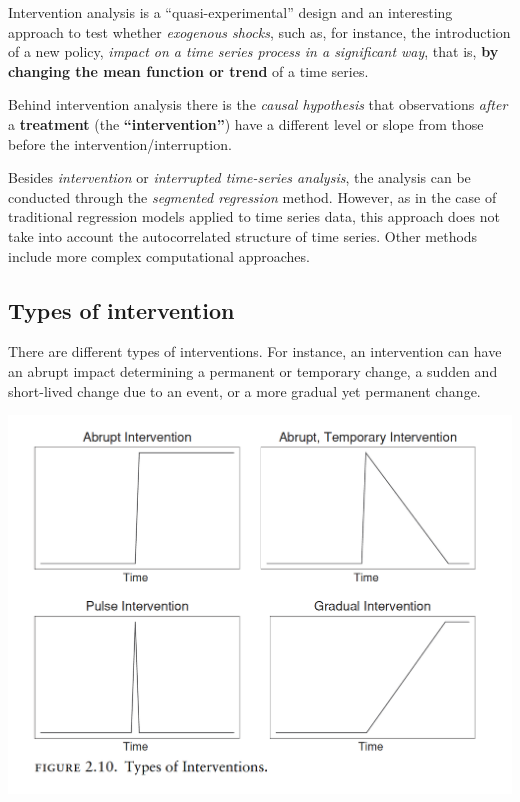 \documentclass[
]{article}
\begin{document}
Intervention analysis is a ``quasi-experimental'' design and an interesting approach to test whether \emph{exogenous shocks}, such as, for instance, the introduction of a new policy, \emph{impact on a time series process in a significant way}, that is, \textbf{by changing the mean function or trend} of a time series.

Behind intervention analysis there is the \emph{causal hypothesis} that observations \emph{after} a \textbf{treatment} (the \textbf{``intervention''}) have a different level or slope from those before the intervention/interruption.

Besides \emph{intervention} or \emph{interrupted time-series analysis}, the analysis can be conducted through the \emph{segmented regression} method. However, as in the case of traditional regression models applied to time series data, this approach does not take into account the autocorrelated structure of time series. Other methods include more complex computational approaches.

\hypertarget{types-of-intervention}{%
\subsection{Types of intervention}\label{types-of-intervention}}

There are different types of interventions. For instance, an intervention can have an abrupt impact determining a permanent or temporary change, a sudden and short-lived change due to an event, or a more gradual yet permanent change.

\includegraphics[width=19.28in]{images/intervention}
\end{document}
